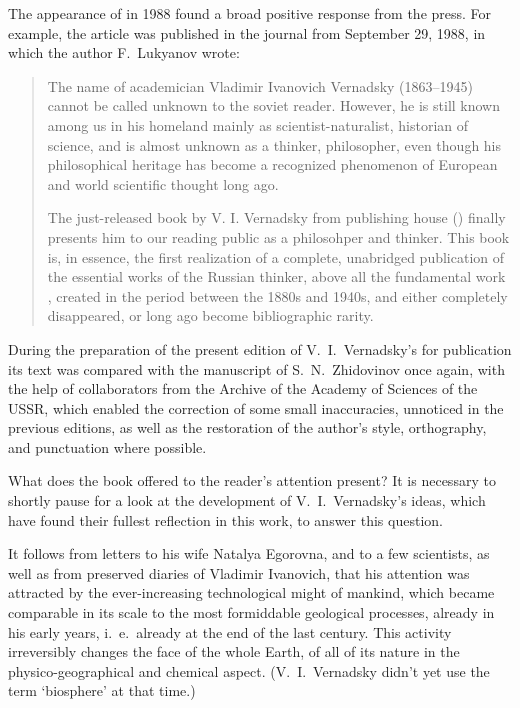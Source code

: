 The appearance of  in 1988 found a broad
positive response from the press.  For example, the article
 was published in the journal
 from September 29, 1988, in which the author
F.~Lukyanov wrote:
\begin{quotation}
  The name of academician Vladimir Ivanovich Vernadsky (1863--1945) cannot be
  called unknown to the soviet reader.  However, he is still known among us in
  his homeland mainly as scientist-naturalist, historian of science, and is
  almost unknown as a thinker, philosopher, even though his philosophical
  heritage has become a recognized phenomenon of European and world scientific
  thought long ago.
  
  The just-released book by V. I. Vernadsky from publishing house 
  ()  finally presents him
  to our reading public as a philosohper and
  thinker.  This book is, in essence, the first realization of a complete,
  unabridged publication of the essential works of the Russian thinker, above
  all the fundamental work , created in the period between the 1880s and 1940s, and either
  completely disappeared, or long ago become bibliographic rarity.
\end{quotation}

During the preparation of the present edition of V.~I.\ Vernadsky's
 for publication its text was compared
with the manuscript of S.~N.\ Zhidovinov once
again, with the help of collaborators from the Archive of the Academy of
Sciences of the USSR, which enabled the correction
of some small inaccuracies, unnoticed in the previous editions, as well as the
restoration of the author's style, orthography, and punctuation where possible.

What does the book offered to the reader's attention present?  It is necessary
to shortly pause for a look at the development of V.~I.\ Vernadsky's ideas,
which have found their fullest reflection in this work, to answer this
question.
\medskip

It follows from letters to his wife Natalya Egorovna, and to a few scientists, as well as from preserved diaries of
Vladimir Ivanovich, that his attention was attracted by the ever-increasing
technological might of mankind, which became comparable in its scale to the
most formiddable geological processes, already in his early years, i.~e.\
already at the end of the last century.  This activity irreversibly changes the
face of the whole Earth, of all of its nature in the physico-geographical and
chemical aspect.  (V.~I.\ Vernadsky didn't yet use the term `biosphere' at that
time.)

